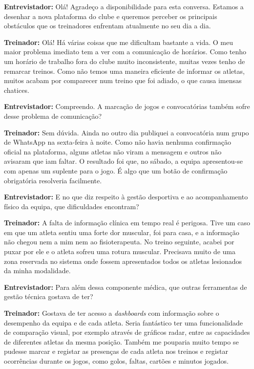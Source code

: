 \begin{tcolorbox}[colback=white, colframe=gray!50, arc=1mm, title=\textbf{Transcrição da Entrevista ao Treinador}]
\small
\textbf{Entrevistador:} Olá! Agradeço a disponibilidade para esta conversa. Estamos a desenhar a nova plataforma do clube e queremos perceber os principais obstáculos que os treinadores enfrentam atualmente no seu dia a dia.

\textbf{Treinador:} Olá! Há várias coisas que me dificultam bastante a vida. O meu maior problema imediato tem a ver com a comunicação de horários. Como tenho um horário de trabalho fora do clube muito inconsistente, muitas vezes tenho de remarcar treinos. Como não temos uma maneira eficiente de informar os atletas, muitos acabam por comparecer num treino que foi adiado, o que causa imensas chatices.

\textbf{Entrevistador:} Compreendo. A marcação de jogos e convocatórias também sofre desse problema de comunicação?

\textbf{Treinador:} Sem dúvida. Ainda no outro dia publiquei a convocatória num grupo de WhatsApp na sexta-feira à noite. Como não havia nenhuma confirmação oficial na plataforma, alguns atletas não viram a mensagem e outros não avisaram que iam faltar. O resultado foi que, no sábado, a equipa apresentou-se com apenas um suplente para o jogo. É algo que um botão de confirmação obrigatória resolveria facilmente.

\textbf{Entrevistador:} E no que diz respeito à gestão desportiva e ao acompanhamento físico da equipa, que dificuldades encontram?

\textbf{Treinador:} A falta de informação clínica em tempo real é perigosa. Tive um caso em que um atleta sentiu uma forte dor muscular, foi para casa, e a informação não chegou nem a mim nem ao fisioterapeuta. No treino seguinte, acabei por puxar por ele e o atleta sofreu uma rotura muscular. Precisava muito de uma zona reservada no sistema onde fossem apresentados todos os atletas lesionados da minha modalidade.

\textbf{Entrevistador:} Para além dessa componente médica, que outras ferramentas de gestão técnica gostava de ter?

\textbf{Treinador:} Gostava de ter acesso a \textit{dashboards} com informação sobre o desempenho da equipa e de cada atleta. Seria fantástico ter uma funcionalidade de comparação visual, por exemplo através de gráficos radar, entre as capacidades de diferentes atletas da mesma posição. Também me pouparia muito tempo se pudesse marcar e registar as presenças de cada atleta nos treinos e registar ocorrências durante os jogos, como golos, faltas, cartões e minutos jogados.


\end{tcolorbox}
